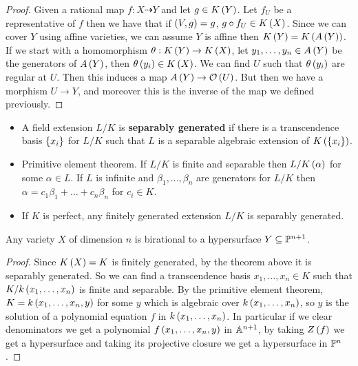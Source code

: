 \begin{proof}
Given a rational map $ f : X \dashrightarrow Y $ and let $ g \in K\rb{Y} $. Let $ f_U $ be a representative of $ f $ then we have that if $ \rb{V, g} = g $, $ g \circ f_U \in K\rb{X} $. Since we can cover $ Y $ using affine varieties, we can assume $ Y $ is affine then $ K\rb{Y} = K\rb{A\rb{Y}} $. If we start with a homomorphism $ \theta : K\rb{Y} \to K\rb{X} $, let $ y_1, \dots, y_n \in A\rb{Y} $ be the generators of $ A\rb{Y} $, then $ \theta\rb{y_i} \in K\rb{X} $. We can find $ U $ such that $ \theta\rb{y_i} $ are regular at $ U $. Then this induces a map $ A\rb{Y} \to \OO\rb{U} $. But then we have a morphism $ U \to Y $, and moreover this is the inverse of the map we defined previously.
\end{proof}

\begin{definition}
\hfill
\begin{itemize}
\item A field extension $ L / K $ is \textbf{separably generated} if there is a transcendence basis $ \cb{x_i} $ for $ L / K $ such that $ L $ is a separable algebraic extension of $ K\rb{\cb{x_i}} $.
\item Primitive element theorem. If $ L / K $ is finite and separable then $ L / K\rb{\alpha} $ for some $ \alpha \in L $. If $ L $ is infinite and $ \beta_1, \dots, \beta_n $ are generators for $ L / K $ then $ \alpha = c_1\beta_1 + \dots + c_n\beta_n $ for $ c_i \in K $.
\item If $ K $ is perfect, any finitely generated extension $ L / K $ is separably generated.
\end{itemize}
\end{definition}

\begin{theorem}
Any variety $ X $ of dimension $ n $ is birational to a hypersurface $ Y \subseteq \P^{n + 1} $.
\end{theorem}

\begin{proof}
Since $ K\rb{X} = K $ is finitely generated, by the theorem above it is separably generated. So we can find a transcendence basis $ x_1, \dots, x_n \in K $ such that $ K / k\rb{x_1, \dots, x_n} $ is finite and separable. By the primitive element theorem, $ K = k\rb{x_1, \dots, x_n, y} $ for some $ y $ which is  algebraic over $ k\rb{x_1, \dots, x_n} $, so $ y $ is the solution of a polynomial equation $ f $ in $ k\rb{x_1, \dots, x_n} $. In particular if we clear denominators we get a polynomial $ f\rb{x_1, \dots, x_n, y} $ in $ \A^{n + 1} $, by taking $ Z\rb{f} $ we get a hypersurface and taking its projective closure we get a hypersurface in $ \P^n $.
\end{proof}

